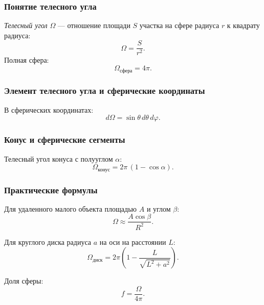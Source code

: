 \documentclass[12pt, a4paper]{article}
\begin{document}
\subsubsection*{Понятие телесного угла}
\textit{Телесный угол} $\Omega$ — отношение площади $S$ участка на сфере радиуса $r$ к квадрату радиуса:
\[
\Omega=\frac{S}{r^2}.
\]
Полная сфера:
\[
\Omega_{\text{сфера}}=4\pi.
\]

\subsubsection*{Элемент телесного угла и сферические координаты}
В сферических координатах:
\[
d\Omega=\sin\theta\,d\theta\,d\varphi.
\]

\subsubsection*{Конус и сферические сегменты}
Телесный угол конуса с полууглом $\alpha$:
\[
\Omega_{\text{конус}}=2\pi\,(1-\cos\alpha).
\]

\subsubsection*{Практические формулы}
Для удаленного малого объекта площадью $A$ и углом $\beta$:
\[
\Omega\approx \frac{A\cos\beta}{R^2}.
\]

Для круглого диска радиуса $a$ на оси на расстоянии $L$:
\[
\Omega_{\text{диск}}=2\pi\left(1-\frac{L}{\sqrt{L^2+a^2}}\right).
\]

Доля сферы:
\[
f=\frac{\Omega}{4\pi}.
\]
\end{document}
